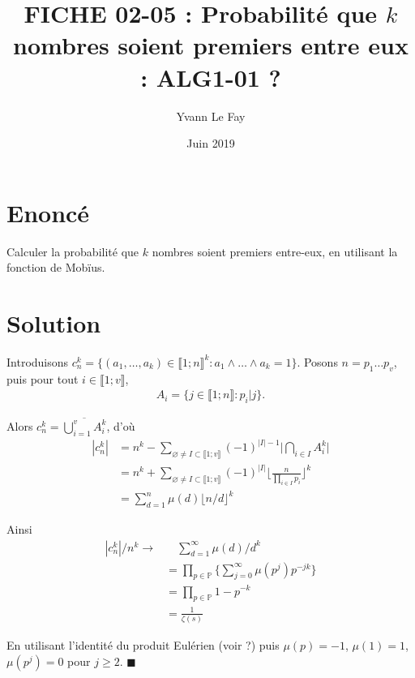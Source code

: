\documentclass{article}
\newcommand*{\QED}{\hfill\ensuremath{\blacksquare}}%
\begin{document}
\title{FICHE 02-05 : Probabilité que $k$ nombres soient premiers entre eux : ALG1-01 ?}
\author{Yvann Le Fay}
\date{Juin 2019}
\maketitle

\section*{Enoncé}
Calculer la probabilité que $k$ nombres soient premiers entre-eux, en utilisant la fonction de Mobïus.
\section*{Solution}
Introduisons $c_n^k = \{(a_1,\ldots,a_k)\in\llbracket 1;n\rrbracket ^k : a_1 \wedge \ldots \wedge a_k = 1\}$.
Posons $n = p_1\ldots p_v$, puis pour tout $i\in\llbracket 1;v\rrbracket$,
\begin{align*}
A_i = \{j\in\llbracket 1;n\rrbracket : p_i | j\}.
\end{align*}

Alors $c_n^k = \overline{\bigcup_{i=1}^{v}A_i^k}$, d'où
\begin{align*}
|c_n^k| &= n^k -\sum_{\varnothing\neq I\subset \llbracket 1;v\rrbracket}(-1)^{|I|-1}\bigg|\bigcap_{i\in I}{A_i^k}\bigg|\\
&= n^k+\sum_{\varnothing\neq I\subset \llbracket 1;v\rrbracket}(-1)^{|I|}\bigg \lfloor \frac{n}{\prod_{i\in I}p_i}\bigg\rfloor^k \\
&= \sum_{d=1}^n \mu(d)\lfloor n/d\rfloor^k 
\end{align*}

Ainsi \begin{align*}
|c_n^k|/n^k \longrightarrow &\quad \sum_{d=1}^{\infty}{\mu(d)/d^k}\\
& = \prod_{p\in \mathbb{P}}\bigg\{\sum_{j=0}^{\infty}\mu(p^j)p^{-jk}\bigg\}\\
& = \prod_{p\in \mathbb{P}}1-p^{-k} \\ &= \frac{1}{\zeta(s)}
\end{align*}

En utilisant l'identité du produit Eulérien (voir ?) puis $\mu(p) = -1$, $\mu(1) = 1$, $\mu(p^j) = 0$ pour $j\geq 2$.
\QED
\end{document}
